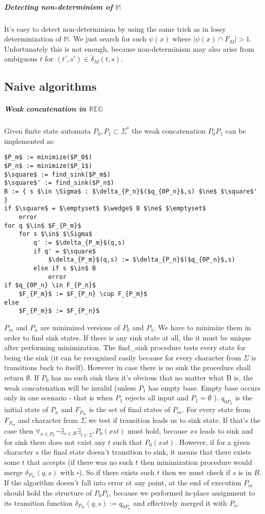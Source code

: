 \documentclass[12pt]{article}
\begin{document}
\subparagraph{Detecting non-determinism  of $\mathbb{M}$}
It's easy to detect non-determinism by using the same trick as in lossy determinization of  $\mathbb{M}$. We just search for such $\psi(x)$ where $\vert\psi(x) \cap F_M\vert > 1$. Unfortunately this is not enough, because non-determinism may also arise from ambiguous  $t$ for $(t',s') \in \check{\delta}_M(t,s)$.

\subsection{Naive algorithms}
\subparagraph{Weak concatenation in $\mathbb{REG}$}
Given finite state automata $P_0,P_1 \subset \Sigma^*$ the weak concatenation $P_0P_1 $ can be implemented as:
\begin{lstlisting}
$P_m$ := minimize($P_0$)
$P_n$ := minimize($P_1$)
$\square$ := find_sink($P_m$)
$\square$' := find_sink($P_n$)
B := { s $\in \Sigma$ : $\delta_{P_n}$($q_{0P_n}$,s) $\ne$ $\square$' }
if $\square$ = $\emptyset$ $\wedge$ B $\ne$ $\emptyset$
    error
for q $\in$ $F_{P_m}$ 
    for s $\in$ $\Sigma$
        q' := $\delta_{P_m}$(q,s)
        if q' = $\square$ 
            $\delta_{P_m}$(q,s) := $\delta_{P_n}$($q_{0P_n}$,s) 
        else if s $\in$ B
            error
if $q_{0P_n} \in F_{P_n}$            
    $F_{P_m}$ := $F_{P_n} \cup F_{P_m}$
else 
    $F_{P_m}$ := $F_{P_n}$
\end{lstlisting}
$P_m$ and $P_n$ are minimized versions of $P_0$ and $P_1$. We have to minimize them in order to find sink states.  If there is any sink state at all, the it must be unique after performing minimization. The find\_sink procedure tests every state for being the sink (it can be recognized easily because for every character from $\Sigma$ is transitions back to itself). However in case there is no sink the procedure shall return $\emptyset$. If $P_0$ has no such sink then it's obvious that no matter what B is, the weak concatenation will be invalid (unless  $P_1$ has empty base. Empty base occurs only in one scenario - that is when $P_1$ rejects all input and $P_1 = \emptyset$ ). $q_{0P_n}$ is the initial state of $P_n$ and $F_{P_m}$ is the set of final states of $P_m$. For every state from $F_{P_m}$ and character from $\Sigma$ we test if transition leads us to sink state. If that's the case then $\forall_{x\in P_0} \neg \exists_{s\in B} \exists_{t\in\Sigma^*} P_0(xst)$ must hold, because $xs$ leads to sink and for sink there does not exist any $t$ such that $ P_0(xst)$. However, if for a given  character $s$ the final state doesn't transition to sink, it means that there exists some $t$ that accepts (if there was no such $t$ then minimization procedure would merge $\delta_{P_m}(q,s)$ with $\square$). So if there exists such $t$ then we must check if $s$ is in $B$. If the algorithm doesn't fall into error at any point, at the end of execution $P_m$ should hold the structure of $P_0P_1$, because we performed in-place assignment to its transition function $\delta_{P_m}(q,s) := q_{0P_n}$ and effectively merged it with $P_n$.
\end{document}
